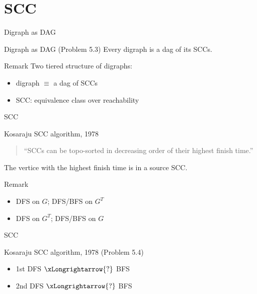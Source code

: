 \section{SCC}

\begin{frame}{Digraph as DAG}
  \begin{exampleblock}{Digraph as DAG (Problem 5.3)}
    Every digraph is a dag of its SCCs.
  \end{exampleblock}

  \begin{alertblock}{Remark}
    Two tiered structure of digraphs:
    \begin{itemize}
	  \item digraph $\equiv$ a dag of SCCs
      \item SCC: equivalence class over reachability
    \end{itemize}
  \end{alertblock}
\end{frame}
\begin{frame}{SCC}
  \begin{exampleblock}{Kosaraju SCC algorithm, 1978}
	\begin{quote}
	  ``SCCs can be topo-sorted in decreasing order of their highest finish time.''
	\end{quote}

	\pause
	\centerline{The vertice with the highest finish time is in a source SCC.}
  \end{exampleblock}

  \pause
  \begin{alertblock}{Remark}
    \begin{itemize}
      \item DFS on $G$; \; DFS/BFS on $G^{T}$
      \item DFS on $G^{T}$; DFS/BFS on $G$
    \end{itemize}
  \end{alertblock}
\end{frame}
\begin{frame}{SCC}
  \begin{exampleblock}{Kosaraju SCC algorithm, 1978 (Problem 5.4)}
    \begin{itemize}
      \item 1st DFS $\xLongrightarrow{?}$ BFS
      \item 2nd DFS $\xLongrightarrow{?}$ BFS
    \end{itemize}
  \end{exampleblock}
\end{frame}
